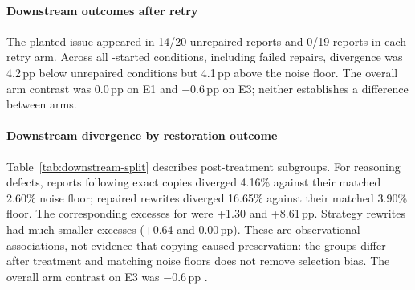 \paragraph{Downstream outcomes after retry}
The planted issue appeared in 14/20 unrepaired reports and 0/19 reports in
each retry arm. Across all -started conditions, including failed
repairs, divergence was 4.2\,pp  below unrepaired conditions
but 4.1\,pp  above the noise floor. The overall arm contrast
was 0.0\,pp on E1 and $-0.6$\,pp  on E3; neither establishes
a difference between arms.

\paragraph{Downstream divergence by restoration outcome}
Table~\ref{tab:downstream-split} describes post-treatment subgroups. For
reasoning defects, reports following  exact copies diverged 4.16\%
against their matched 2.60\% noise floor; repaired rewrites diverged 16.65\%
against their matched 3.90\% floor. The corresponding excesses for 
were +1.30 and +8.61\,pp. Strategy rewrites had much smaller excesses
(+0.64 and 0.00\,pp). These are observational associations, not evidence that
copying caused preservation: the groups differ after treatment and matching
noise floors does not remove selection bias. The overall arm contrast on E3
was $-0.6$\,pp .

